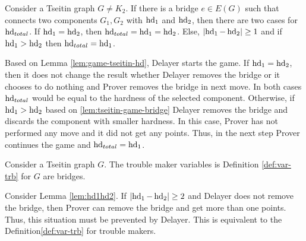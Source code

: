 \documentclass{report}
\begin{document}
\begin{lem}\label{lem:hd1hd2}
Consider a Tseitin graph $G \not = K_2$. If there is a bridge $e \in E(G)$ such that connects two components $G_1,G_2$ with $\operatorname{hd}_1$ and $\operatorname{hd}_2$, then there are two cases for $\operatorname{hd}_{total}$. If $\operatorname{hd}_1= \operatorname{hd}_2$, then $\operatorname{hd}_{total}= \operatorname{hd}_1= \operatorname{hd}_2$. Else, $ \lvert \operatorname{hd}_1- \operatorname{hd}_2  \rvert \geq 1$ and if $ \operatorname{hd}_1 > \operatorname{hd}_2 $  then $\operatorname{hd}_{total}= \operatorname{hd}_1$.
\end{lem}	
\begin{prf}
Based on Lemma \ref{lem:game-tseitin-hd}, Delayer starts the game. If $\operatorname{hd}_1= \operatorname{hd}_2$, then it does not change the result whether Delayer removes the bridge or it chooses to do nothing and Prover removes the bridge in next move. In both cases $\operatorname{hd}_{total}$ would be equal to the hardness of the selected component. Otherwise, if $ \operatorname{hd}_1 > \operatorname{hd}_2 $ based on \ref{lem:tseitin-game-bridge} Delayer removes the bridge and discards the  component with smaller hardness. In this case, Prover has not performed any move and it did not get any points. Thus, in the next step Prover continues the game and  $\operatorname{hd}_{total}= \operatorname{hd}_1$.
\end{prf}

\begin{lem}\label{lem:troubllemk-hd}
Consider a Tseitin graph $G$. The trouble maker variables is Definition \ref{def:var-trb} for $G$ are bridges.
\end{lem}
\begin{prf}
Consider Lemma \ref{lem:hd1hd2}. If $ \lvert \operatorname{hd}_1- \operatorname{hd}_2  \rvert \geq 2$ and Delayer does not remove the bridge, then Prover can remove the bridge and get more than one points. Thus, this situation must be prevented by Delayer. This is equivalent to the Definition\ref{def:var-trb} for trouble makers.
\end{prf}
\end{document}
